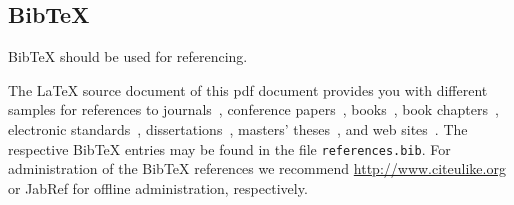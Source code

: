 \documentclass{llncs}
\begin{document}
\subsection{BibTeX}

BibTeX should be used for referencing.

The LaTeX source document of this pdf document provides you with different samples for references to journals~\cite{jour:B2BServices}, conference papers~\cite{proc:TheWebMLApproach}, books~\cite{book:umlatwork}, book chapters~\cite{incoll:ErhardKonrad1992}, electronic standards~\cite{man:BPEL}, dissertations~\cite{phdthesis:manuelWimmer}, masters' theses~\cite{mast:AUMLProfile}, and web sites~\cite{misc:BIGWebsite}. The respective BibTeX entries may be found in the file \texttt{references.bib}. For administration of the BibTeX references we recommend \url{http://www.citeulike.org} or JabRef for offline administration, respectively.



\end{document}
